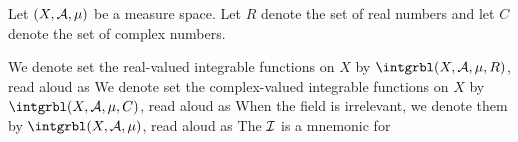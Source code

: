 
Let $(X, \mathcal{A}, \mu)$
be a measure space.
Let $R$ denote
the set of real numbers
and let $C$ denote
the set of complex numbers.

We denote set the
real-valued integrable
functions on $X$
by $\intgrbl(X, \SA, \mu, R)$,
read aloud as 
We denote set the
complex-valued integrable
functions on $X$
by $\intgrbl(X, \SA, \mu, C)$,
read aloud as 
When the field is irrelevant,
we denote them by $\intgrbl(X, \SA, \mu)$,
read aloud as 
The $\mathcal{I}$ is a mnemonic for 
\strats
